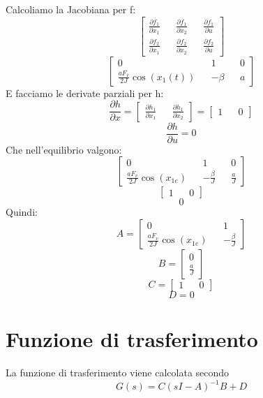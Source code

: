 \documentclass{article}
\begin{document}
Calcoliamo la Jacobiana per f:
\[\begin{bmatrix}
\frac{\partial f_1}{\partial x_1} && \frac{\partial f_1}{\partial x_2} && \frac{\partial f_1}{\partial u}
\\
\frac{\partial f_2}{\partial x_1} && \frac{\partial f_2}{\partial x_2} && \frac{\partial f_2}{\partial u}
\end{bmatrix}\]
\[\begin{bmatrix}
0 && 1 && 0
\\
\frac{aF_{v}}{2J}\cos{(x_1(t))} && -\beta && a
\end{bmatrix}\]
E facciamo le derivate parziali per h:
\[\frac{\partial h}{\partial x}=\begin{bmatrix}
\frac{\partial h_1}{\partial x_1} && \frac{\partial h_1}{\partial x_2} \end{bmatrix}=\begin{bmatrix}
1 && 0 \end{bmatrix}\]
\[\frac{\partial h}{\partial u}=0\]
Che nell'equilibrio valgono:
\[\begin{bmatrix}
0 && 1 && 0
\\
\frac{aF_{v}}{2J}\cos{(x_{1e})} && -\frac{\beta}{J} && \frac{a}{J}
\end{bmatrix}\]
\[\begin{bmatrix}
1 && 0 \end{bmatrix}\]
\[0\]
Quindi:
\[A=\begin{bmatrix}
0 && 1
\\
\frac{aF_{v}}{2J}\cos{(x_{1e})} && -\frac{\beta}{J}
\end{bmatrix}\]
\[B=\begin{bmatrix}
0
\\
\frac{a}{J} 
\end{bmatrix}\]
\[C=\begin{bmatrix}
1 && 0 \end{bmatrix}\]
\[D=0\]
\section{Funzione di trasferimento}
La funzione di trasferimento viene calcolata secondo
\[G(s)=C(sI-A)^{-1}B+D\]
\end{document}
